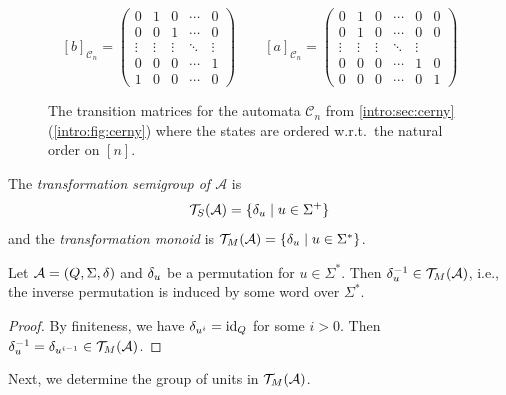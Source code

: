 \begin{figure}[th]
	\centering
	\[
	[b]_{\mathcal C_n} =
	\left( {\begin{array}{ccccc}
			0 & 1 &  0 & \cdots & 0\\
			0 & 0 &  1 & \cdots & 0\\
			\vdots & \vdots & \vdots & \ddots & \vdots\\
			0 & 0 & 0 & \cdots & 1 \\
			1 & 0 & 0 & \cdots & 0
	\end{array} } \right)
	\qquad 
	[a]_{\mathcal C_n} =
	\left( {\begin{array}{cccccc}
			0 & 1 &  0 & \cdots & 0 & 0 \\
			0 & 1 &  0 & \cdots & 0 & 0 \\
			\vdots & \vdots & \vdots & \ddots & \vdots\\
			0 & 0 & 0 & \cdots & 1 & 0 \\
			0 & 0 & 0 & \cdots & 0 & 1
	\end{array} } \right)
	\]
	\caption[The transition matrices for the \Cerny automata $\mathcal C_n$]{
		The transition matrices for the \Cerny automata $\mathcal C_n$
		from \cref{intro:sec:cerny} (\cref{intro:fig:cerny})
		where the states are ordered w.r.t.~the natural order on $[n]$.
	}
	\label{prelim:fig:transitionmtxCerny}
\end{figure} 

\label{def:transformation_semigroup}
The \emph{transformation semigroup of $\mathcal A$} is 
\[ \mathcal T_S(\mathcal A) = \{ {\delta}_{u} \mid u \in \Sigma^+ \}
\] 
and the \emph{transformation monoid} is $\mathcal T_M(\mathcal A) =  \{ {\delta}_{u} \mid u \in \Sigma^* \}$. 
\label{def:transformation_monoid}

\begin{proposition}
	\label{sync_max:prop:grp_of_units_inv}	
	Let $\mathcal A = (Q, \Sigma, \delta)$
	and ${\delta}_{u}$ be a permutation for $u \in \Sigma^*$.
	Then ${\delta}_{u}^{-1} \in \mathcal T_M(\mathcal A)$,
	i.e., the inverse permutation
	is induced by some word over $\Sigma^*$.
\end{proposition}
\begin{proof}
	By finiteness, 
    we have ${\delta}_{u^i} = \operatorname{id}_Q$ for some $i > 0$.
	Then ${\delta}_{u}^{-1} = {\delta}_{u^{i-1}} \in \mathcal T_M(\mathcal A)$.	
\end{proof}

Next, we determine the group of units in $\mathcal T_M(\mathcal A)$.

